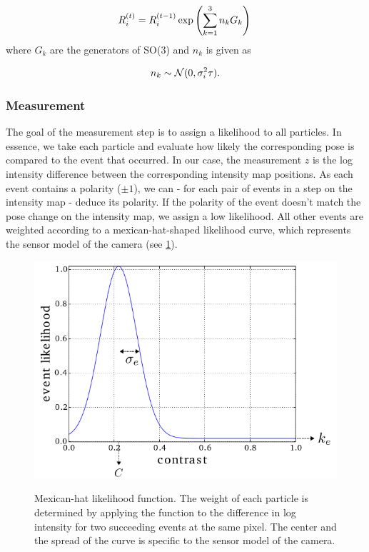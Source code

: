 \documentclass[10pt,twocolumn,letterpaper]{article}
\begin{document}
\begin{equation}
      R^{(t)}_i = R^{(t-1)}_i \exp \left(
    \sum_{k=1}^3n_k G_k
    \right) \\
\end{equation}
where $G_k$ are the generators of SO(3) and $n_k$ is given as 

\begin{equation}
    n_k \sim \mathcal N (0, \sigma_i^2\tau).\\
\end{equation}


\subsubsection*{Measurement}
The goal of the measurement step is to assign a likelihood to all particles. In essence, we take each particle and evaluate how likely the corresponding pose is compared to the event that occurred. 
In our case, the measurement $z$ is the log intensity difference between the corresponding intensity map positions. 
As each event contains a polarity ($\pm 1$), we can - for each pair of events in a step on the intensity map - deduce its polarity. If the polarity of the event doesn't match the pose change on the intensity map, we assign a low likelihood. All other events are weighted according to a mexican-hat-shaped likelihood curve, which represents the sensor model of the camera (see \cref{fig:mexican}). 

\begin{figure}[h!]
   \centering
    \includegraphics[width=0.6\linewidth]{figures/mexican.png}
    \label{fig:mexican}
    \caption{Mexican-hat likelihood function. The weight of each particle is determined by applying the function to the difference in log intensity for two succeeding events at the same pixel. The center and the spread of the curve is specific to the sensor model of the camera.\cite{kim2014simultaneous}}
\end{figure}
\end{document}

